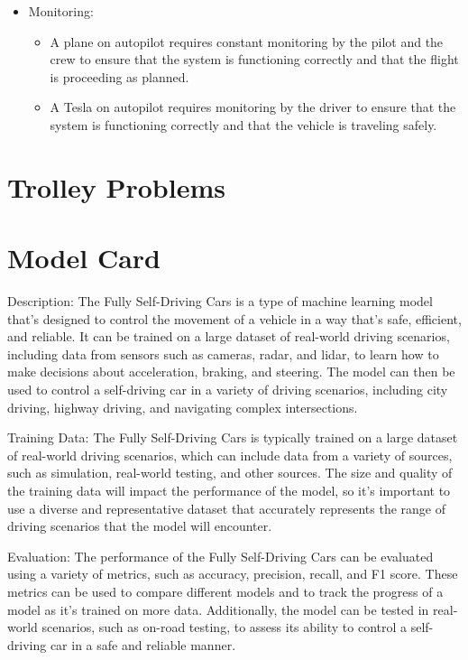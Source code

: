 \begin{itemize}
\item Monitoring: 
    \begin{itemize}
        \item A plane on autopilot requires constant monitoring by the pilot and the crew to ensure that the system is functioning correctly and that the flight is proceeding as planned.
        \item A Tesla on autopilot requires monitoring by the driver to ensure that the system is functioning correctly and that the vehicle is traveling safely.
    \end{itemize}
\end{itemize}


\section{Trolley Problems}

\section{Model Card}

Description:
The Fully Self-Driving Cars is a type of machine learning model that's designed to control the movement of a vehicle in a way that's safe, efficient, and reliable. It can be trained on a large dataset of real-world driving scenarios, including data from sensors such as cameras, radar, and lidar, to learn how to make decisions about acceleration, braking, and steering. The model can then be used to control a self-driving car in a variety of driving scenarios, including city driving, highway driving, and navigating complex intersections.

Training Data:
The Fully Self-Driving Cars is typically trained on a large dataset of real-world driving scenarios, which can include data from a variety of sources, such as simulation, real-world testing, and other sources. The size and quality of the training data will impact the performance of the model, so it's important to use a diverse and representative dataset that accurately represents the range of driving scenarios that the model will encounter.

Evaluation:
The performance of the Fully Self-Driving Cars can be evaluated using a variety of metrics, such as accuracy, precision, recall, and F1 score. These metrics can be used to compare different models and to track the progress of a model as it's trained on more data. Additionally, the model can be tested in real-world scenarios, such as on-road testing, to assess its ability to control a self-driving car in a safe and reliable manner.

